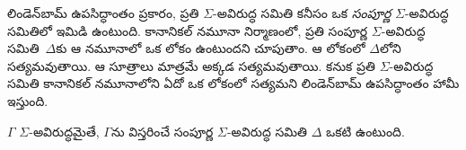 \documentclass[../../../include/open-logic-section]{subfiles}
\begin{document}


లిండెన్‌బామ్ ఉపసిద్ధాంతం ప్రకారం, ప్రతి $\Sigma$-అవిరుద్ధ
 సమితి కనీసం ఒక
\emph{సంపూర్ణ} $\Sigma$-అవిరుద్ధ సమితిలో ఇమిడి ఉంటుంది.
కానానికల్ నమూనా నిర్మాణంలో, ప్రతి సంపూర్ణ $\Sigma$-అవిరుద్ధ
సమితి~$\Delta$కు ఆ నమూనాలో ఒక లోకం ఉంటుందని చూపుతాం.
ఆ లోకంలో $\Delta$లోని 
సత్యమవుతాయి. ఆ సూత్రాలు మాత్రమే అక్కడ సత్యమవుతాయి. కనుక ప్రతి $\Sigma$-అవిరుద్ధ సమితి
కానానికల్ నమూనాలోని ఏదో ఒక లోకంలో సత్యమని
లిండెన్‌బామ్ ఉపసిద్ధాంతం హామీ ఇస్తుంది.

\begin{thm}[లిండెన్‌బామ్ ఉపసిద్ధాంతం]
  $\Gamma$ $\Sigma$-అవిరుద్ధమైతే, $\Gamma$ను విస్తరించే
  సంపూర్ణ $\Sigma$-అవిరుద్ధ సమితి $\Delta$ ఒకటి ఉంటుంది.
\end{thm}
\end{document}
